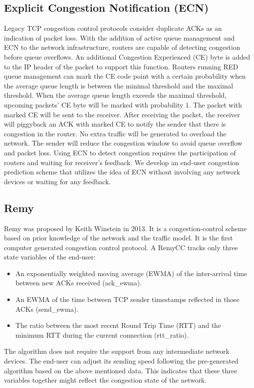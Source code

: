 \subsection{Explicit Congestion Notification (ECN)}
\par Legacy TCP congestion control protocols consider duplicate ACKs as an indication of packet loss. With the addition of active queue management and ECN \cite{ramakrishnan2001rfc} to the network infrastructure, routers are capable of detecting congestion before queue overflows. An additional Congestion Experienced (CE) byte is added to the IP header of the packet to support this function. Routers running RED queue management can mark the CE code point with a certain probability when the average queue length is between the minimal threshold and the maximal threshold. When the average queue length exceeds the maximal threshold, upcoming packets' CE byte will be marked with probability $1$. The packet with marked CE will be sent to the receiver. After receiving the packet, the receiver will piggyback an ACK with marked CE to notify the sender that there is congestion in the router. No extra traffic will be generated to overload the network. The sender will reduce the congestion window to avoid queue overflow and packet loss. Using ECN to detect congestion requires the participation of routers and waiting for receiver's feedback. We develop an end-user congestion prediction scheme that utilizes the idea of ECN without involving any network devices or waiting for any feedback.
\subsection{Remy}
\par Remy \cite{winstein2013tcp} was proposed by Keith Winstein in 2013. It is a congestion-control scheme based on prior knowledge of the network and the traffic model. It is the first computer generated congestion control protocol. A RemyCC tracks only three state variables of the end-user:
\begin{itemize}
\item An exponentially weighted moving average (EWMA) of the inter-arrival time between new ACKs received (ack\_ewma).
\item An EWMA of the time between TCP sender timestamps reflected in those ACKs (send\_ewma).
\item The ratio between the most recent Round Trip Time (RTT) and the minimum RTT during the current connection (rtt\_ratio).
\end{itemize}
The algorithm does not require the support from any intermediate network devices. The end-user can adjust its sending speed following the pre-generated algorithm based on the above mentioned data. This indicates that these three variables together might reflect the congestion state of the network. 


